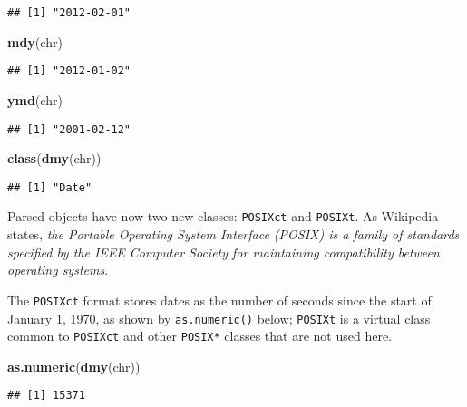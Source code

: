 \documentclass[]{book}
\newenvironment{Shaded}{\begin{snugshade}}{\end{snugshade}}
\newcommand{\KeywordTok}[1]{\textcolor[rgb]{0.13,0.29,0.53}{\textbf{{#1}}}}
\newcommand{\NormalTok}[1]{{#1}}
\begin{document}
\begin{verbatim}
## [1] "2012-02-01"
\end{verbatim}

\begin{Shaded}
\begin{Highlighting}[]
\KeywordTok{mdy}\NormalTok{(chr)}
\end{Highlighting}
\end{Shaded}

\begin{verbatim}
## [1] "2012-01-02"
\end{verbatim}

\begin{Shaded}
\begin{Highlighting}[]
\KeywordTok{ymd}\NormalTok{(chr)}
\end{Highlighting}
\end{Shaded}

\begin{verbatim}
## [1] "2001-02-12"
\end{verbatim}

\begin{Shaded}
\begin{Highlighting}[]
\KeywordTok{class}\NormalTok{(}\KeywordTok{dmy}\NormalTok{(chr))}
\end{Highlighting}
\end{Shaded}

\begin{verbatim}
## [1] "Date"
\end{verbatim}

Parsed objects have now two new classes: \texttt{POSIXct} and
\texttt{POSIXt}. As Wikipedia states, \emph{the Portable Operating
System Interface (POSIX) is a family of standards specified by the IEEE
Computer Society for maintaining compatibility between operating
systems}.

The \texttt{POSIXct} format stores dates as the number of seconds since
the start of January 1, 1970, as shown by \texttt{as.numeric()} below;
\texttt{POSIXt} is a virtual class common to \texttt{POSIXct} and other
\texttt{POSIX*} classes that are not used here.

\begin{Shaded}
\begin{Highlighting}[]
\KeywordTok{as.numeric}\NormalTok{(}\KeywordTok{dmy}\NormalTok{(chr))}
\end{Highlighting}
\end{Shaded}

\begin{verbatim}
## [1] 15371
\end{verbatim}
\end{document}
